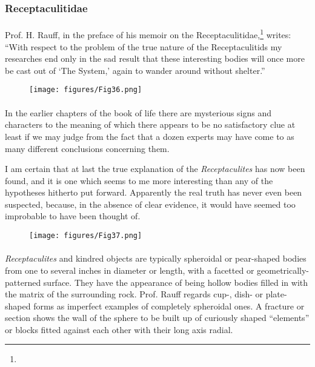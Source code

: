 \documentclass[a4paper, 12pt, oneside]{article}
\begin{document}
\subsubsection{Receptaculitidae}
\paragraph{}
Prof. H. Rauff, in the preface of his memoir on the Receptaculitidae,\footnote{} writes: ``With respect to the problem of the true nature of the Receptaculitids my researches end only in the sad result that these interesting bodies will once more be cast out of `The System,' again to wander around without shelter.''
\begin{figure}[H]
\centering
\texttt{[image: figures/Fig36.png]}
\caption*{}
\end{figure}
\paragraph{}
In the earlier chapters of the book of life there are mysterious signs and characters to the meaning of which there appears to be no satisfactory clue at least if we may judge from the fact that a dozen experts may have come to as many different conclusions concerning them.

I am certain that at last the true explanation of the \emph{Receptaculites} has now been found, and it is one which seems to me more interesting than any of the hypotheses hitherto put forward. Apparently the real truth has never even been suspected, because, in the absence of clear evidence, it would have seemed too improbable to have been thought of.
\begin{figure}[H]
\centering
\texttt{[image: figures/Fig37.png]}
\caption*{}
\end{figure}
\paragraph{}
\emph{Receptaculites} and kindred objects are typically spheroidal or pear-shaped bodies from one to several inches in diameter or length, with a facetted or geometrically-patterned surface. They have the appearance of being hollow bodies filled in with the matrix of the surrounding rock. Prof. Rauff regards cup-, dish- or plate-shaped forms as imperfect examples of completely spheroidal ones. A fracture or section shows the wall of the sphere to be built up of curiously shaped ``elements'' or blocks fitted against each other with their long axis radial.
\end{document}
